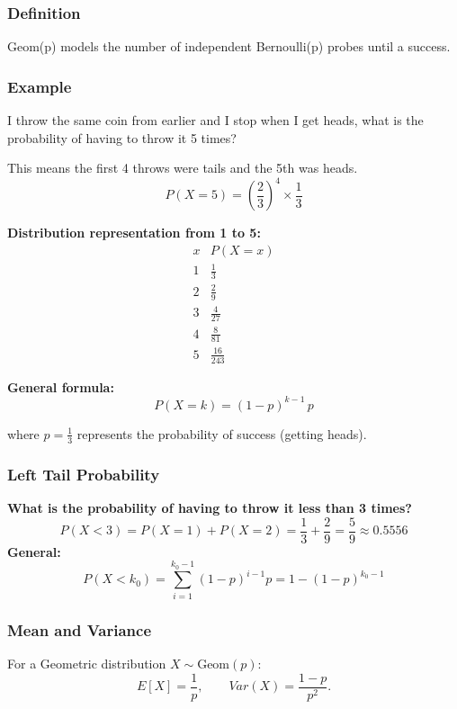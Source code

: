 \documentclass[12pt]{article}
\begin{document}
\subsubsection{
    Definition
}
Geom(p) models the number of independent Bernoulli(p) probes until a success.

\subsubsection{
    Example
}
I throw the same coin from earlier and I stop when I get heads, what is the probability of having to throw it 5 times?

This means the first 4 throws were tails and the 5th was heads.\newline
\[
P(X = 5) = \left( \frac{2}{3} \right)^{4} \times \frac{1}{3}
\]

\textbf{Distribution representation from 1 to 5:}\newline
\[
\begin{array}{c|c}
x & P(X = x) \\ \hline
1 & \frac{1}{3} \\[4pt]
2 & \frac{2}{9} \\[4pt]
3 & \frac{4}{27} \\[4pt]
4 & \frac{8}{81} \\[4pt]
5 & \frac{16}{243}
\end{array}
\]

\textbf{General formula:}\newline
\[
P(X = k) = (1 - p)^{k - 1} \, p
\]

where \( p = \frac{1}{3} \) represents the probability of success (getting heads).\newline

\subsubsection{
    Left Tail Probability
}
\textbf{What is the probability of having to throw it less than 3 times?}\newline
\[
P(X < 3) = P(X=1) + P(X=2) = \frac{1}{3} + \frac{2}{9} = \frac{5}{9} \approx 0.5556
\]
\textbf{General:}
\[
P(X < k_0) = \sum_{i=1}^{k_0 - 1} (1-p)^{i-1} p = 1 - (1-p)^{k_0 - 1}
\]

\subsubsection{
    Mean and Variance
}
For a Geometric distribution \( X \sim \mathrm{Geom}(p) \):
\[
E[X] = \frac{1}{p}, \qquad Var(X) = \frac{1 - p}{p^2}.
\]
\end{document}
